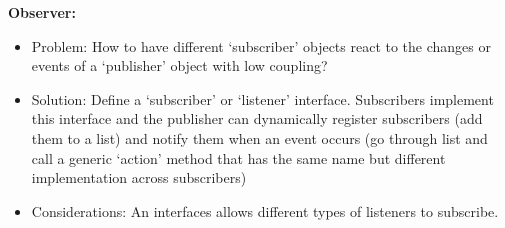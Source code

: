 \documentclass[a4paper,10pt]{article}
\begin{document}
\textcolor{Periwinkle}{\textbf{Observer:}}
\renewcommand{\labelitemi}{\textperiodcentered}
\begin{itemize}
\item\textcolor{Periwinkle}{Problem:} How to have different `subscriber' objects react to the changes or events of a `publisher' object with low coupling? 
\item\textcolor{Periwinkle}{Solution:} Define a `subscriber' or `listener' interface. Subscribers implement this interface and the publisher can dynamically register subscribers (add them to a list) and notify them when an event occurs (go through list and call a generic `action' method that has the same name but different implementation across subscribers)
\item\textcolor{Periwinkle}{Considerations:} An interfaces allows different types of listeners to subscribe. 
\end{itemize}
\newpage 
\end{document}
